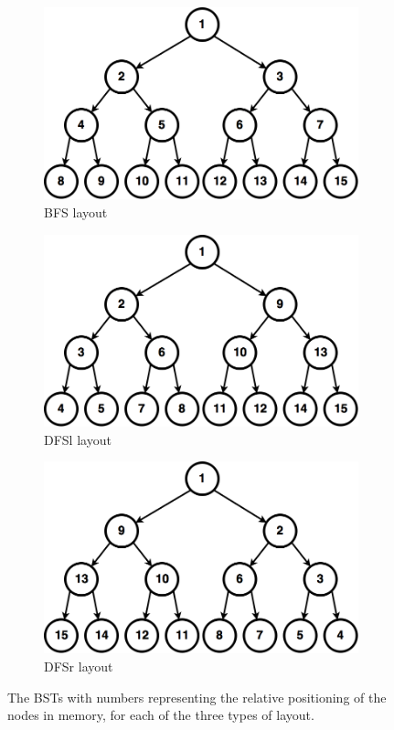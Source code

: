 \documentclass{article}
\begin{document}
\begin{figure}[H]
  \centering
  \begin{subfigure}[b]{0.51\textwidth}
  	\includegraphics[width=\textwidth]{figures/BFS_layout}
  	\caption{BFS layout}
  \end{subfigure}
  \begin{subfigure}[b]{0.49\textwidth}
    \includegraphics[width=\textwidth]{figures/DFSl_layout}	
    \caption{DFSl layout}
  \end{subfigure}
    \begin{subfigure}[b]{0.49\textwidth}
    \includegraphics[width=\textwidth]{figures/DFSr_layout}	
    \caption{DFSr layout}
  \end{subfigure}
  \caption{The BSTs with numbers representing the relative positioning of the nodes in memory, for each of the three types of layout.}
  \label{fig:BST_layouts}
\end{figure}
\end{document}
